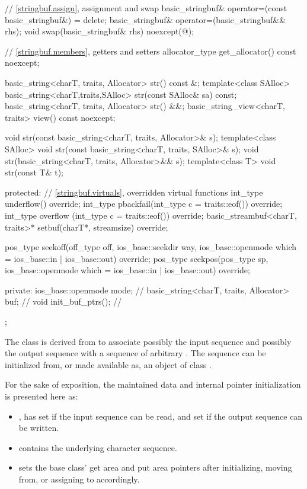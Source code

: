 \begin{codeblock}
{{    // \ref{stringbuf.assign}, assignment and swap
    basic_stringbuf& operator=(const basic_stringbuf&) = delete;
    basic_stringbuf& operator=(basic_stringbuf&& rhs);
    void swap(basic_stringbuf& rhs) noexcept(@\seebelow@);

    // \ref{stringbuf.members}, getters and setters
    allocator_type get_allocator() const noexcept;

    basic_string<charT, traits, Allocator> str() const &;
    template<class SAlloc>
      basic_string<charT,traits,SAlloc> str(const SAlloc& sa) const;
    basic_string<charT, traits, Allocator> str() &&;
    basic_string_view<charT, traits> view() const noexcept;

    void str(const basic_string<charT, traits, Allocator>& s);
    template<class SAlloc>
      void str(const basic_string<charT, traits, SAlloc>& s);
    void str(basic_string<charT, traits, Allocator>&& s);
    template<class T>
      void str(const T& t);

  protected:
    // \ref{stringbuf.virtuals}, overridden virtual functions
    int_type underflow() override;
    int_type pbackfail(int_type c = traits::eof()) override;
    int_type overflow (int_type c = traits::eof()) override;
    basic_streambuf<charT, traits>* setbuf(charT*, streamsize) override;

    pos_type seekoff(off_type off, ios_base::seekdir way,
                     ios_base::openmode which
                      = ios_base::in | ios_base::out) override;
    pos_type seekpos(pos_type sp,
                     ios_base::openmode which
                      = ios_base::in | ios_base::out) override;

  private:
    ios_base::openmode mode;                        // \expos
    basic_string<charT, traits, Allocator> buf;     // \expos
    void init_buf_ptrs();                           // \expos
  };
}
\end{codeblock}

\pnum
The class
is derived from
to associate possibly the input sequence and possibly
the output sequence with a sequence of arbitrary
.
The sequence can be initialized from, or made available as, an object of class
.

\pnum
For the sake of exposition,
the maintained data and internal pointer initialization is presented here as:
\begin{itemize}
\item
  , has
   set if the input sequence can be read, and
   set if the output sequence can be written.
\item
  contains the underlying character sequence.
\item
   sets the base class'
  get area and
  put area pointers
  after initializing, moving from, or assigning to  accordingly.
\end{itemize}

